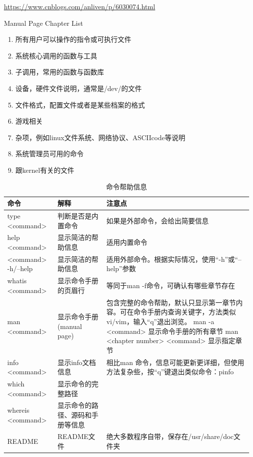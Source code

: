 \documentclass[doctor,openright,twoside]{sjtuthesis}
\providecommand{\tightlist}{%
    \setlength{\itemsep}{0pt}\setlength{\parskip}{0pt}}
\theoremstyle{plain}
\theoremstyle{definition}
\theoremstyle{remark}
\theoremstyle{ocrenumbox}
\theoremstyle{plain}
\begin{document}
\url{https://www.cnblogs.com/anliven/p/6030074.html}

Manual Page Chapter List

\begin{enumerate}
\def\labelenumi{\arabic{enumi}.}
\tightlist
\item
  所有用户可以操作的指令或可执行文件
\item
  系统核心调用的函数与工具
\item
  子调用，常用的函数与函数库
\item
  设备，硬件文件说明，通常是/dev/的文件
\item
  文件格式，配置文件或者是某些档案的格式
\item
  游戏相关
\item
  杂项，例如linux文件系统、网络协议、ASCIIcode等说明
\item
  系统管理员可用的命令
\item
  跟kernel有关的文件
\end{enumerate}

\begin{longtable}{|L{1.3in}|L{1.5in}|L{2.5in}|}
\caption{\label{tab:maninfo}命令帮助信息} \\ \hline
\centerline{\textbf{命令}} & \centerline{\textbf{解释}} & \centerline{\textbf{注意点}}\\
\endhead\hline
{}
type <command> & 判断是否是内置命令 & 如果是外部命令，会给出简要信息 \\
help <command> & 显示简洁的帮助信息 & 适用内置命令 \\
<command> -h/--help & 显示简洁的帮助信息 & 适用外部命令。根据实际情况，使用“-h”或“--help”参数 \\
whatis <command> & 显示命令手册的页眉行 & 等同于man -f命令，可确认有哪些章节存在 \\
man <command> & 显示命令手册(manual page) & 包含完整的命令帮助，默认只显示第一章节内容。可在命令手册内查询关键字，方法类似vi/vim，输入“q”退出浏览。\newline
man -a <command> 显示命令手册的所有章节 \newline
man <chapter number> <command> 显示指定章节 \\
info <command> & 显示info文档信息 & 相比man 命令，信息可能更新更详细，但使用方法复杂些，按“q”键退出类似命令：pinfo \\
which <command> & 显示命令的完整路径 &   \\ 
whereis <command> & 显示命令的路径、源码和手册等信息 &  \\
README & README文件 & 绝大多数程序自带，保存在/usr/share/doc文件夹 \\
\hline
\end{longtable}
\end{document}

